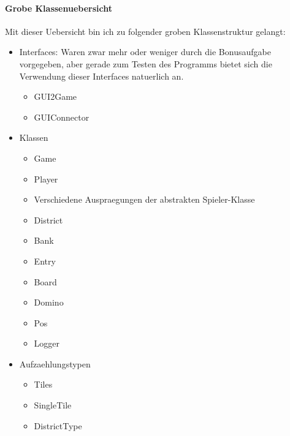 \paragraph{Grobe Klassenuebersicht}
Mit dieser Uebersicht bin ich zu folgender groben Klassenstruktur gelangt: 
\begin{itemize}
	\item Interfaces: Waren zwar mehr oder weniger durch die Bonusaufgabe vorgegeben, aber gerade zum Testen des Programms bietet sich die Verwendung dieser Interfaces natuerlich an. 
	\begin{itemize}
		\item GUI2Game
		\item GUIConnector
	\end{itemize}
	\item Klassen
	\begin{itemize}
		\item Game
		\item Player
		\item Verschiedene Auspraegungen der abstrakten Spieler-Klasse
		\item District
		\item Bank
		\item Entry
		\item Board
		\item Domino
		\item Pos
		\item Logger
	\end{itemize}
	\item Aufzaehlungstypen
	\begin{itemize}
		\item Tiles
		\item SingleTile
		\item DistrictType
	\end{itemize}
\end{itemize}

